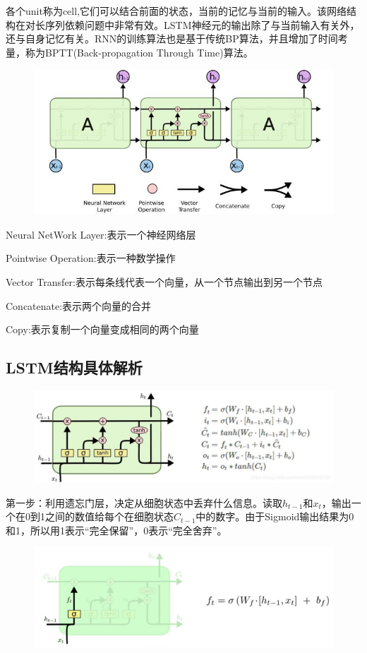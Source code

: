 \documentclass[openbib]{article}
\begin{document}
各个unit称为cell,它们可以结合前面的状态，当前的记忆与当前的输入。该网络结构在对长序列依赖问题中非常有效。LSTM神经元的输出除了与当前输入有关外，还与自身记忆有关。RNN的训练算法也是基于传统BP算法，并且增加了时间考量，称为BPTT(Back-propagation Through Time)算法。
\begin{figure}[htbp]
	\centering
	\includegraphics[scale=0.42]{LSTM内部结构}
\end{figure}

Neural NetWork Layer:表示一个神经网络层

Pointwise Operation:表示一种数学操作

Vector Transfer:表示每条线代表一个向量，从一个节点输出到另一个节点

Concatenate:表示两个向量的合并

Copy:表示复制一个向量变成相同的两个向量
\subsection{LSTM结构具体解析}
\begin{figure}[H]
	\centering
	\includegraphics[scale=0.4]{LSTM}
\end{figure}
第一步：利用遗忘门层，决定从细胞状态中丢弃什么信息。读取$h_{t-1}$和$x_t$，输出一个在0到1之间的数值给每个在细胞状态$C_{t-1}$中的数字。由于Sigmoid输出结果为0和1，所以用1表示“完全保留”，0表示“完全舍弃”。
\begin{figure}[H]
	\centering
	\includegraphics[scale=0.4]{衰减系数计算过程}
\end{figure}
\end{document}
